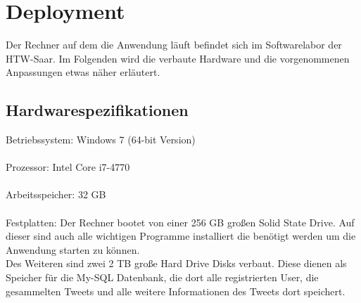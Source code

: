 \section{Deployment}
Der Rechner auf dem die Anwendung läuft befindet sich im Softwarelabor der HTW-Saar. Im Folgenden wird die verbaute Hardware und die vorgenommenen Anpassungen etwas näher erläutert.
\subsection{Hardwarespezifikationen}
Betriebssystem: Windows 7 (64-bit Version)
\\\\
Prozessor: Intel Core i7-4770
\\\\
Arbeitsspeicher: 32 GB
\\\\
Festplatten: Der Rechner bootet von einer 256 GB großen Solid State Drive. Auf dieser sind auch alle wichtigen Programme installiert die benötigt werden um die Anwendung starten zu können.
\\
Des Weiteren sind zwei 2 TB große Hard Drive Disks verbaut. Diese dienen als Speicher für die My-SQL Datenbank, die dort alle registrierten User, die gesammelten Tweets und alle weitere Informationen des Tweets dort speichert.

